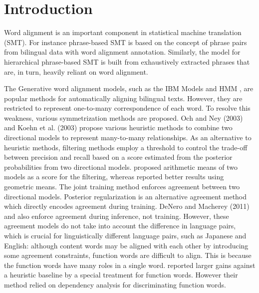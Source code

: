 \documentclass[english]{jnlp_1.4}
\begin{document}
\maketitle

\section{Introduction}
\label{intro}

Word alignment is an important component in statistical machine translation (SMT).
For instance phrase-based SMT \cite{koehn2003statistical} is based on the concept of phrase pairs from bilingual data with word alignment annotation.
Similarly, the  model for hierarchical phrase-based SMT is built from exhaustively extracted phrases that are, in turn, heavily reliant on word alignment.

The Generative word alignment models, such as the IBM Models \cite{brown1993mathematics} and HMM \cite{vogel1996hmm}, are popular methods for automatically aligning bilingual texts. However, they  are restricted to represent one-to-many  correspondence of each word.
To resolve this weakness, various symmetrization methods are proposed.
Och and Ney (2003) and Koehn et al. (2003) propose various heuristic methods to combine two directional models to represent many-to-many relationships. 
As an alternative to heuristic methods, filtering methods employ a threshold to control the trade-off between precision and recall based on a score estimated from the posterior probabilities from two directional models.
proposed arithmetic means of two models as a score for the filtering, 
    whereas  
reported better results using geometric means.
The joint training method \cite{liang-taskar-klein:2006:HLT-NAACL06-Main} enforces agreement between two directional models.
Posterior regularization \cite{ganchev2010posterior} is an alternative agreement method which directly encodes agreement  during training.
DeNero and Macherey (2011) and 
also enforce agreement during inference, not training.
However, these agreement models do not take into account the difference in language pairs, which is crucial for linguistically different language pairs, such as Japanese and English: although content words may be aligned with each other by introducing some agreement constraints, function words are difficult to align.
This is because the function words have many roles in a single word.
reported larger gains against a heuristic baseline by a special treatment for function words.
However their method relied on dependency analysis for  discriminating function words.
\end{document}
